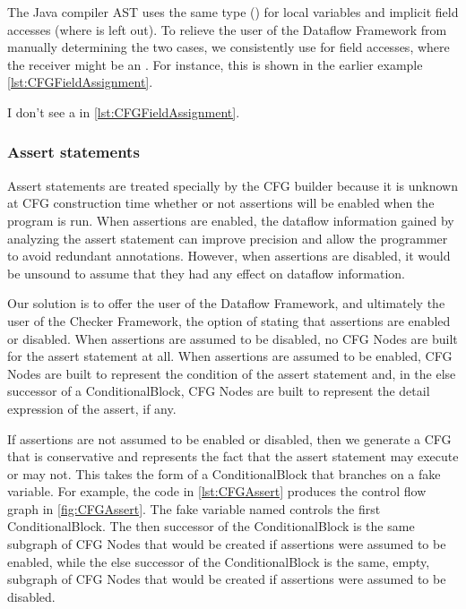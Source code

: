 The Java compiler AST uses the same type () for
local variables and implicit field accesses (where  is
left out).  To relieve the user of the Dataflow Framework from
manually determining the two cases, we consistently use
 for field accesses, where the receiver might be
an .  For instance, this is shown in the
earlier example \autoref{lst:CFGFieldAssignment}.

\begin{workinprogress}
I don't see a  in \autoref{lst:CFGFieldAssignment}.
\end{workinprogress}


\subsubsection{Assert statements}
\label{sec:assert-stmts}

Assert statements are treated specially by the CFG builder because it
is unknown at CFG construction time whether or not assertions will be
enabled when the program is run.  When assertions are enabled, the
dataflow information gained by analyzing the assert statement can
improve precision and allow the programmer to avoid redundant
annotations.  However, when assertions are disabled, it would be
unsound to assume that they had any effect on dataflow information.

Our solution is to offer the user of the Dataflow Framework, and
ultimately the user of the Checker Framework, the option of stating that
assertions are enabled or disabled.  When assertions are assumed to be
disabled, no CFG Nodes are built for the assert statement at all.
When assertions are assumed to be enabled, CFG Nodes are built to
represent the condition of the assert statement and, in the else
successor of a ConditionalBlock, CFG Nodes are built to represent the
detail expression of the assert, if any.

If assertions are not assumed to be enabled or disabled, then we
generate a CFG that is conservative and represents the fact that the
assert statement may execute or may not.  This takes the form of a
ConditionalBlock that branches on a fake variable.  For example, the
code in \autoref{lst:CFGAssert} produces the control flow graph in
\autoref{fig:CFGAssert}.  The fake variable named
 controls the first ConditionalBlock.
The then successor of the ConditionalBlock is the same subgraph of CFG
Nodes that would be created if assertions were assumed to be enabled,
while the else successor of the ConditionalBlock is the same, empty,
subgraph of CFG Nodes that would be created if assertions were assumed
to be disabled.

